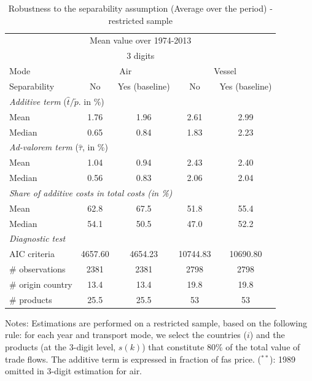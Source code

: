 \documentclass[a4paper,11pt]{article}
\begin{document}
\begin{table}[htbp]
  \centering
  \caption{Robustness to the separability assumption (Average over the period) - restricted sample}
\begin{center}
    \begin{tabular}{lcc|cc}
    \hline \hline
    \multicolumn{5}{c}{Mean value over 1974-2013} \\
 \multicolumn{5}{c}{3 digits} \\    \hline \hline
   Mode  & \multicolumn{2}{c|}{Air} & \multicolumn{2}{c}{Vessel} \\ \hline
   Separability & No  & Yes (baseline) & No & Yes (baseline)\\ \hline
    \multicolumn{5}{l}{\textit{Additive term} ($\widehat{t}/\widetilde{p}$.
in \%)}  \\
    Mean  & 1.76 & 1.96 & 2.61 & 2.99 \\
    Median &0.65 & 0.84 &1.83 & 2.23 \\ \hline
    \multicolumn{5}{l}{\textit{Ad-valorem term} ($\widehat{\tau}$, in \%)}\\
    Mean  & 1.04 & 0.94 & 2.43 & 2.40 \\
    Median & 0.56 & 0.83 & 2.06 & 2.04 \\ \hline
\multicolumn{5}{l}{\textit{Share of additive costs in total costs (in \%)}} \\
    Mean  & 62.8  & 67.5  & 51.8  & 55.4 \\
    Median & 54.1  & 50.5  & 47.0  & 52.2 \\  \hline
 \textit{Diagnostic test} & & &  &  \\
    AIC criteria & 4657.60 & 4654.23 & 10744.83 & 10690.80 \\ \hline
\# observations & 2381 & 2381 & 2798 & 2798 \\
\# origin country & 13.4 & 13.4 & 19.8 & 19.8 \\
\# products & 25.5 & 25.5 & 53 & 53 \\ \hline \hline
    \end{tabular}%
\end{center}
\parbox[l]{10cm}{\tiny{Notes: Estimations are performed on a restricted sample, based on the following rule: for each year and transport mode, we select the countries ($i$) and the products (at the 3-digit level, $s(k)$) that constitute 80\% of the total value of trade flows.
The additive term is expressed in fraction of fas price.
($^{\ast \ast}$): 1989 omitted in 3-digit estimation for air.}}
\label{tab:robustness_separability}
\end{table}
\end{document}
